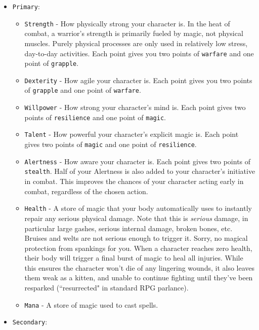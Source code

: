 \documentclass{report}
\begin{document}
\begin{itemize}
        \begin{itemize}
        \item \verb|Primary|:
            \begin{itemize}
                \item \verb|Strength| - How physically strong your character is. In the heat of combat, a warrior's strength is primarily fueled by magic, not physical muscles. Purely physical
                    processes are only used in relatively low stress, day-to-day activities. Each point gives you two points of \verb|warfare| and one point of \verb|grapple|.
                \item \verb|Dexterity| - How agile your character is. Each point gives you two points of \verb|grapple| and one point of \verb|warfare|.
                \item \verb|Willpower| - How strong your character's mind is. Each point gives two points of \verb|resilience| and one point of \verb|magic|.
                \item \verb|Talent| - How powerful your character's explicit magic is. Each point gives two points of \verb|magic| and one point of \verb|resilience|.
                \item \verb|Alertness| - How aware your character is. Each point gives two points of \verb|stealth|. Half of your Alertness is also added to your character's initiative in combat. 
                    This improves the chances of your character acting early in combat, regardless of the chosen action.
                \item \verb|Health| - A store of magic that your body automatically uses to
                instantly repair any serious physical damage. Note that this is \emph{serious}
                damage, in particular large gashes, serious internal damage, broken bones,
                etc. Bruises and welts are not serious enough to trigger it. Sorry, no 
                magical protection from spankings for you. When a character reaches zero health,
                their body will trigger a final burst of magic to heal all injuries. While this ensures
                the character won't die of any lingering wounds, it also leaves them weak as a kitten, and unable to continue fighting until they've been resparked 
                (``resurrected" in standard RPG parlance).
                \item \verb|Mana| - A store of magic used to cast spells.
            \end{itemize}
        \item \verb|Secondary|:

\end{itemize}
\end{itemize}
\end{document}
